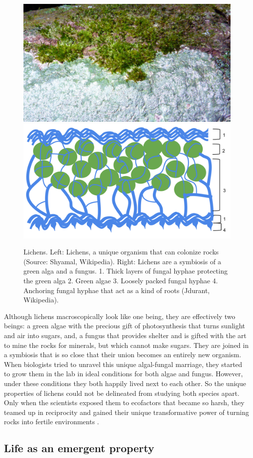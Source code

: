 \documentclass[
  11pt,
]{book}
\begin{document}
\begin{figure}

{\centering \includegraphics[width=0.45\linewidth]{./figs/lichen} \includegraphics[width=0.45\linewidth]{./figs/LichenDiagram} 

}

\caption{Lichens. Left: Lichens, a unique organism that can colonize rocks (Source: Shyamal, Wikipedia). Right: Lichens are a symbiosis of a green alga and a fungus. 1. Thick layers of fungal hyphae protecting the green alga 2. Green algae 3. Loosely packed fungal hyphae 4. Anchoring fungal hyphae that act as a kind of roots (Jdurant, Wikipedia).}\label{fig:lichen}
\end{figure}

Although lichens macroscopically look like one being, they are effectively two beings: a green algae with the precious gift of photosynthesis that turns sunlight and air into sugars, and, a fungus that provides shelter and is gifted with the art to mine the rocks for minerals, but which cannot make sugars. They are joined in a symbiosis that is so close that their union becomes an entirely new organism. When biologists tried to unravel this unique algal-fungal marriage, they started to grow them in the lab in ideal conditions for both algae and fungus. However, under these conditions they both happily lived next to each other. So the unique properties of lichens could not be delineated from studying both species apart. Only when the scientists exposed them to ecofactors that became so harsh, they teamed up in reciprocity and gained their unique transformative power of turning rocks into fertile environments \citep{Kimmerer2013}.

\hypertarget{life-as-an-emergent-property}{%
\subsection{Life as an emergent property}\label{life-as-an-emergent-property}}
\end{document}
